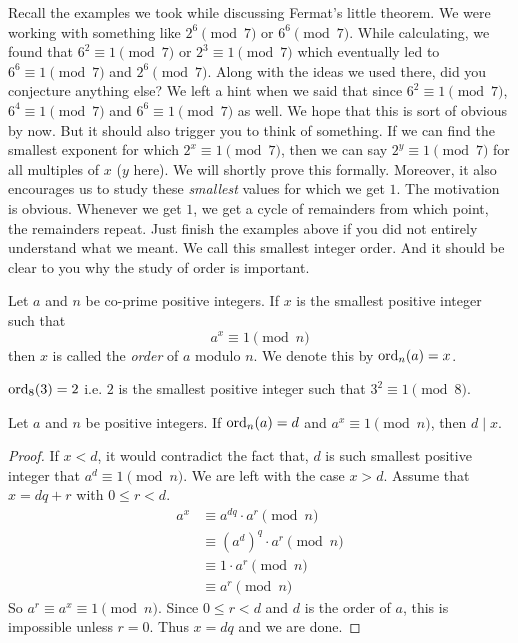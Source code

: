Recall the examples we took while discussing Fermat's little theorem. We were working with something like $2^6\pmod7$ or $6^6\pmod7$. While calculating, we found that $6^2\equiv1\pmod7$ or $2^3\equiv1\pmod7$ which eventually led to $6^6\equiv1\pmod7$ and $2^6\pmod7$. Along with the ideas we used there, did you conjecture anything else? We left a hint when we said that since $6^2\equiv1\pmod7$, $6^4\equiv1\pmod7$ and $6^6\equiv1\pmod7$ as well. We hope that this is sort of obvious by now. But it should also trigger you to think of something. If we can find the smallest exponent for which $2^x\equiv1\pmod7$, then we can say $2^y\equiv1\pmod7$ for all multiples of $x$ ($y$ here). We will shortly prove this formally. Moreover, it also encourages us to study these \textit{smallest }values for which we get $1$. The motivation is obvious. Whenever we get $1$, we get a cycle of remainders from which point, the remainders repeat. Just finish the examples above if you did not entirely understand what we meant. We call this smallest integer order. And it should be clear to you why the study of order is important.
\begin{definition}
	Let $a$ and $n$ be co-prime positive integers. If $x$ is the smallest positive integer such that  \[a^x\equiv1\pmod n\] then $x$ is called the \textit{order} of $a$ modulo $n$. We denote this by $\operatorname{ord}_n(a)=x$.
\end{definition}

\begin{example}
	$\operatorname{ord}_8(3)=2$ i.e. $2$ is the smallest positive integer such that  $3^2\equiv1\pmod 8$.
\end{example}


\begin{theorem}\label{thm:ordDiv}
	Let $a$ and $n$ be positive integers. If $\operatorname{ord}_n(a)=d$ and $a^x\equiv1\pmod n$, then $d\mid x$.
\end{theorem}

\begin{proof}
	If $x<d$, it would contradict the fact that, $d$ is such smallest positive integer that $a^d\equiv1\pmod n$. We are left with the case $x>d$. Assume that $x=dq+r$ with $0\leq r<d$.
		\begin{align*}
			a^x
				& \equiv a^{dq}\cdot a^r\pmod{n}\\
				& \equiv (a^d)^q \cdot a^r\pmod{n}\\
				& \equiv 1 \cdot a^r\pmod{n}\\
				& \equiv a^r \pmod n
		\end{align*}
	So $a^r \equiv a^x \equiv 1 \pmod n$. Since $0\leq r<d$ and $d$ is the order of $a$, this is impossible unless $r=0$. Thus $x=dq$ and we are done.
\end{proof}


